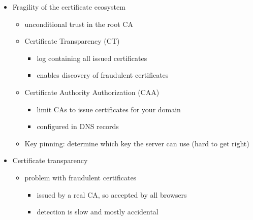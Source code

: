 \documentclass[12pt,titlepage,a4paper]{report}
\begin{document}
\begin{itemize}
				\item Fragility of the certificate ecosystem
				\begin{itemize}
					\item unconditional trust in the root CA
					\item Certificate Transparency (CT)
					\begin{itemize}
						\item log containing all issued certificates
						\item enables discovery of fraudulent certificates
					\end{itemize}
					\item  Certificate Authority Authorization (CAA)
					\begin{itemize}
						\item limit CAs to issue certificates for your domain
						\item configured in DNS records
					\end{itemize}
					\item Key pinning: determine which key the server can use (hard to get right)
				\end{itemize}
			
				\item Certificate transparency
				\begin{itemize}
					\item problem with fraudulent certificates
					\begin{itemize}
						\item issued by a real CA, so accepted by all browsers
						\item detection is slow and mostly accidental
					\end{itemize}
					

\end{itemize}
\end{itemize}
\end{document}
